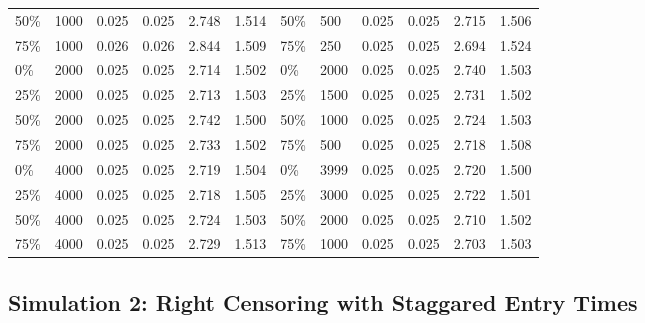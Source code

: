 \begin{table}[!htbp]
\begin{tabular}{@{}C{1.8cm}lllll||C{1.8cm}lllll@{}}
		50\% & 1000   & 0.025  & 0.025 & 2.748 & 1.514 & 50\%  & 500  & 0.025 & 0.025 & 2.715 & 1.506 \\
		75\% & 1000   & 0.026  & 0.026 & 2.844 & 1.509 & 75\%  & 250  & 0.025 & 0.025 & 2.694 & 1.524 \\
		0\%  & 2000   & 0.025  & 0.025 & 2.714 & 1.502 & 0\%   & 2000 & 0.025 & 0.025 & 2.740 & 1.503 \\
		25\% & 2000   & 0.025  & 0.025 & 2.713 & 1.503 & 25\%  & 1500 & 0.025 & 0.025 & 2.731 & 1.502 \\
		50\% & 2000   & 0.025  & 0.025 & 2.742 & 1.500 & 50\%  & 1000 & 0.025 & 0.025 & 2.724 & 1.503 \\
		75\% & 2000   & 0.025  & 0.025 & 2.733 & 1.502 & 75\%  & 500  & 0.025 & 0.025 & 2.718 & 1.508 \\
		0\%  & 4000   & 0.025  & 0.025 & 2.719 & 1.504 & 0\%   & 3999 & 0.025 & 0.025 & 2.720 & 1.500 \\
		25\% & 4000   & 0.025  & 0.025 & 2.718 & 1.505 & 25\%  & 3000 & 0.025 & 0.025 & 2.722 & 1.501 \\
		50\% & 4000   & 0.025  & 0.025 & 2.724 & 1.503 & 50\%  & 2000 & 0.025 & 0.025 & 2.710 & 1.502 \\
		75\% & 4000  & 0.025 & 0.025  & 2.729 & 1.513 & 75\%  & 1000  & 0.025  & 0.025 & 2.703 & 1.503 \\ \bottomrule
	\end{tabular}
	\label{tab:rightcensor}%
\end{table}


\subsection{Simulation 2: Right Censoring with Staggared Entry Times} \label{rightcensor:sim2}


